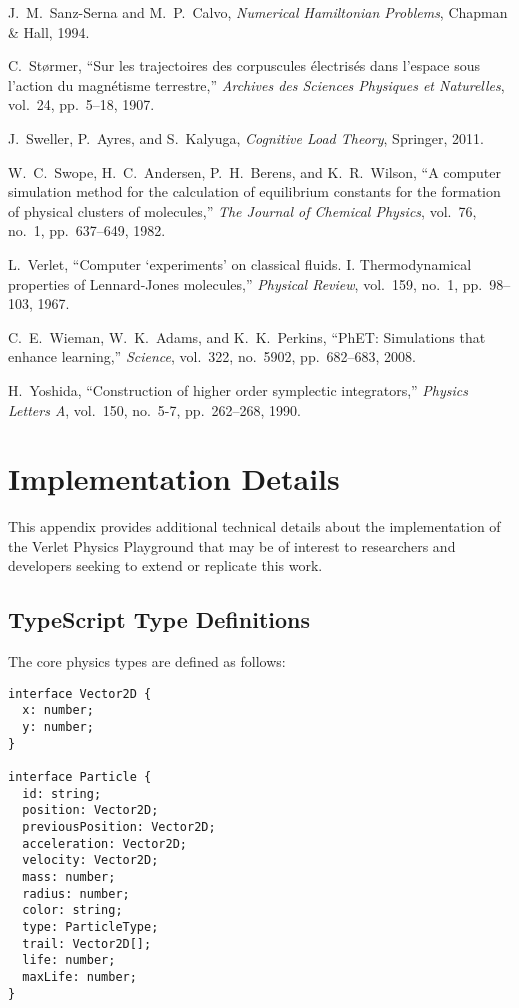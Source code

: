 \documentclass[12pt,journal,onecolumn]{IEEEtran}
\begin{document}
\begin{thebibliography}{99}
J.~M.~Sanz-Serna and M.~P.~Calvo, \emph{Numerical Hamiltonian Problems}, Chapman \& Hall, 1994.

C.~Størmer, ``Sur les trajectoires des corpuscules électrisés dans l'espace sous l'action du magnétisme terrestre,'' \emph{Archives des Sciences Physiques et Naturelles}, vol.~24, pp.~5--18, 1907.

J.~Sweller, P.~Ayres, and S.~Kalyuga, \emph{Cognitive Load Theory}, Springer, 2011.

W.~C.~Swope, H.~C.~Andersen, P.~H.~Berens, and K.~R.~Wilson, ``A computer simulation method for the calculation of equilibrium constants for the formation of physical clusters of molecules,'' \emph{The Journal of Chemical Physics}, vol.~76, no.~1, pp.~637--649, 1982.

L.~Verlet, ``Computer `experiments' on classical fluids. I. Thermodynamical properties of Lennard-Jones molecules,'' \emph{Physical Review}, vol.~159, no.~1, pp.~98--103, 1967.

C.~E.~Wieman, W.~K.~Adams, and K.~K.~Perkins, ``PhET: Simulations that enhance learning,'' \emph{Science}, vol.~322, no.~5902, pp.~682--683, 2008.

H.~Yoshida, ``Construction of higher order symplectic integrators,'' \emph{Physics Letters A}, vol.~150, no.~5-7, pp.~262--268, 1990.

\end{thebibliography}

\appendix

\section{Implementation Details}
\label{app:implementation}

This appendix provides additional technical details about the implementation of the Verlet Physics Playground that may be of interest to researchers and developers seeking to extend or replicate this work.

\subsection{TypeScript Type Definitions}
The core physics types are defined as follows:

\begin{verbatim}
interface Vector2D {
  x: number;
  y: number;
}

interface Particle {
  id: string;
  position: Vector2D;
  previousPosition: Vector2D;
  acceleration: Vector2D;
  velocity: Vector2D;
  mass: number;
  radius: number;
  color: string;
  type: ParticleType;
  trail: Vector2D[];
  life: number;
  maxLife: number;
}
\end{verbatim}
\end{document}
